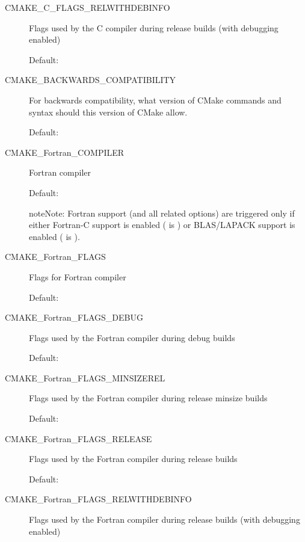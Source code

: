 \documentclass[letterpaper,10pt,english]{sphinxmanual}
\begin{document}
\begin{description}
\item[{CMAKE\_C\_FLAGS\_RELWITHDEBINFO}] \leavevmode
Flags used by the C compiler during release builds (with
debugging enabled)

Default: 

\item[{CMAKE\_BACKWARDS\_COMPATIBILITY}] \leavevmode
For backwards compatibility, what
version of CMake commands and syntax should this version of CMake
allow.

Default: 

\item[{CMAKE\_Fortran\_COMPILER}] \leavevmode
Fortran compiler

Default: 

\begin{notice}{note}{Note:}
Fortran support (and all related options) are triggered only
if either Fortran-C support is enabled ( is ) or
BLAS/LAPACK support is enabled ( is ).
\end{notice}

\item[{CMAKE\_Fortran\_FLAGS}] \leavevmode
Flags for Fortran compiler

Default:

\item[{CMAKE\_Fortran\_FLAGS\_DEBUG}] \leavevmode
Flags used by the Fortran compiler during debug
builds

Default: 

\item[{CMAKE\_Fortran\_FLAGS\_MINSIZEREL}] \leavevmode
Flags used by the Fortran compiler during
release minsize builds

Default: 

\item[{CMAKE\_Fortran\_FLAGS\_RELEASE}] \leavevmode
Flags used by the Fortran compiler during
release builds

Default: 

\item[{CMAKE\_Fortran\_FLAGS\_RELWITHDEBINFO}] \leavevmode
Flags used by the Fortran compiler during release builds (with
debugging enabled)


\end{description}
\end{document}
